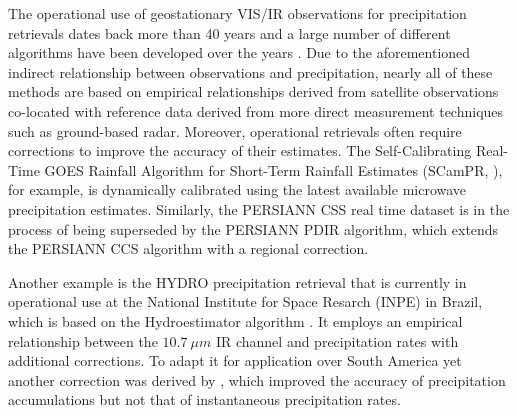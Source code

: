 \documentclass[journal abbreviation, manuscript]{copernicus}
\begin{document}
The operational use of geostationary VIS/IR observations for precipitation
retrievals dates back more than 40 years \citep{scofield77} and a large number
of different algorithms have been developed over the years \citep{arkin87,
  adler88, vicente98, sorooshian00, kuligowski02, roderick03, hong04,
  kuligowski16}. Due to the aforementioned indirect relationship between
observations and precipitation, nearly all of these methods are based on
empirical relationships derived from satellite observations co-located with
reference data derived from more direct measurement techniques such as
ground-based radar. Moreover, operational retrievals often require corrections
to improve the accuracy of their estimates. The Self-Calibrating Real-Time GOES
Rainfall Algorithm for Short-Term Rainfall Estimates (SCamPR,
\citeauthor{kuligowski16} \citeyear{kuligowski16}), for example, is dynamically
calibrated using the latest available microwave precipitation estimates.
Similarly, the PERSIANN CSS real time dataset is in the process of being
superseded by the PERSIANN PDIR algorithm, which extends the PERSIANN CCS
algorithm with a regional correction.


Another example is the HYDRO precipitation retrieval that is currently in
operational use at the National Institute for Space Resarch (INPE) in Brazil,
which is based on the Hydroestimator algorithm \citep{scofield03}. It employs an
empirical relationship between the $10.7\ \unit{\mu m}$ IR channel and
precipitation rates with additional corrections. To adapt it for application
over South America yet another correction was derived by \citet{siqueira19},
which improved the accuracy of precipitation accumulations but not that of
instantaneous precipitation rates.
\end{document}
